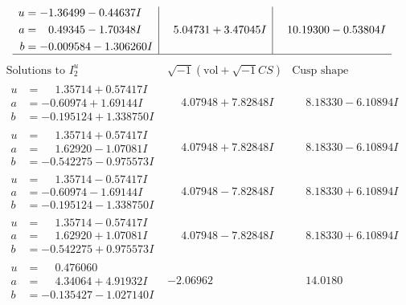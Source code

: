 \documentclass[1p]{elsarticle_modified}
\theoremstyle{definition}
\newcommand{\I}{\sqrt{-1}}
\begin{document}
$$\begin{array}{c|c|c}
\begin{aligned}
u &= -1.36499 - 0.44637 I \\
a &= \phantom{-}0.49345 - 1.70348 I \\
b &= -0.009584 - 1.306260 I\end{aligned}
 & \phantom{-}5.04731 + 3.47045 I & \phantom{-}10.19300 - 0.53804 I\\
 \hline 
 \end{array}$$\newpage$$\begin{array}{c|c|c}  
\text{Solutions to }I^u_{2}& \I (\text{vol} + \sqrt{-1}CS) & \text{Cusp shape}\\
 \hline 
\begin{aligned}
u &= \phantom{-}1.35714 + 0.57417 I \\
a &= -0.60974 + 1.69144 I \\
b &= -0.195124 + 1.338750 I\end{aligned}
 & \phantom{-}4.07948 + 7.82848 I & \phantom{-}8.18330 - 6.10894 I \\ \hline\begin{aligned}
u &= \phantom{-}1.35714 + 0.57417 I \\
a &= \phantom{-}1.62920 - 1.07081 I \\
b &= -0.542275 - 0.975573 I\end{aligned}
 & \phantom{-}4.07948 + 7.82848 I & \phantom{-}8.18330 - 6.10894 I \\ \hline\begin{aligned}
u &= \phantom{-}1.35714 - 0.57417 I \\
a &= -0.60974 - 1.69144 I \\
b &= -0.195124 - 1.338750 I\end{aligned}
 & \phantom{-}4.07948 - 7.82848 I & \phantom{-}8.18330 + 6.10894 I \\ \hline\begin{aligned}
u &= \phantom{-}1.35714 - 0.57417 I \\
a &= \phantom{-}1.62920 + 1.07081 I \\
b &= -0.542275 + 0.975573 I\end{aligned}
 & \phantom{-}4.07948 - 7.82848 I & \phantom{-}8.18330 + 6.10894 I \\ \hline\begin{aligned}
u &= \phantom{-}0.476060\phantom{ +0.000000I} \\
a &= \phantom{-}4.34064 + 4.91932 I \\
b &= -0.135427 - 1.027140 I\end{aligned}
 & -2.06962\phantom{ +0.000000I} & \phantom{-}14.0180\phantom{ +0.000000I} \\ \hline\begin{aligned}

\end{aligned}
\end{array}$$
\end{document}
